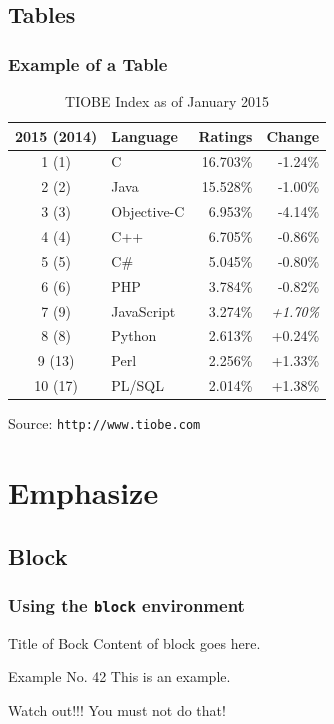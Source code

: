 \documentclass[english,hangout]{beamer}
\begin{document}
\subsection{Tables}

\begin{frame}
 \frametitle{Example of a Table}
\begin{table}[ht]
 \begin{tabular}{clrr} \toprule
 2015 (2014)	& 	Language 	& Ratings 	& Change \\
 \midrule
1	(1)		& C		& 16.703\%	& -1.24\% \\
2	   (2)		& Java	& 15.528\%	& -1.00\% \\
3	   (3)		& Objective-C	& 6.953\%	& -4.14\% \\
4	   (4)		& C++	& 6.705\%	& -0.86\% \\
5	   (5)		& C\#		& 5.045\%	& -0.80\% \\
6	   (6)		& PHP	& 3.784\%	& -0.82\% \\
7	   (9)		& JavaScript	& 3.274\%	& \emph{+1.70\%} \\
8	   (8)		& Python	& 2.613\%	& +0.24\% \\
9	 (13)		& Perl	& 2.256\%	& +1.33\% \\
10	 (17)		& PL/SQL	& 2.014\%	& +1.38\% \\
\bottomrule
 \end{tabular}
 \caption{TIOBE Index as of January 2015}
\end{table}
\vspace{-3mm}
\tiny Source: \texttt{http://www.tiobe.com}
\end{frame}



\section{Emphasize}

\subsection{Block}

\begin{frame}
 \frametitle{Using the \texttt{block} environment}
\begin{block}{Title of Bock}
  Content of block goes here.
\end{block}

\begin{exampleblock}{Example No. 42}
  This is an example.
\end{exampleblock}
 
\begin{alertblock}{Watch out!!!}
  You must not do that!
\end{alertblock}
\end{frame}
\end{document}
